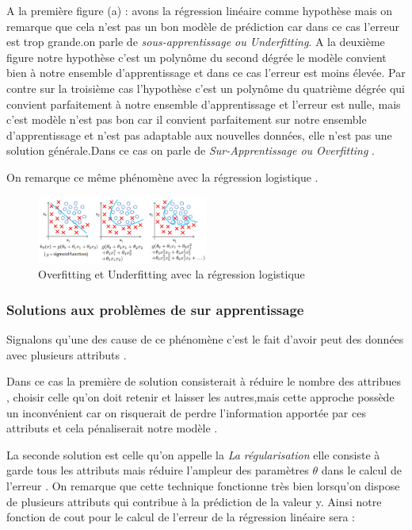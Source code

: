 A la première figure (a) : avons la régression linéaire comme hypothèse  mais on remarque que cela n'est pas un bon modèle de prédiction car dans ce cas l'erreur est trop grande.on parle de \emph{sous-apprentissage ou Underfitting}.
A la deuxième figure notre hypothèse c'est un polynôme du second dégrée le modèle convient bien à notre ensemble d'apprentissage et dans ce cas l'erreur est moins élevée.
Par contre sur la troisième cas l'hypothèse c'est un polynôme du quatrième dégrée qui convient parfaitement à notre ensemble d'apprentissage et l'erreur est nulle, mais c'est modèle n'est pas bon  car il  convient parfaitement sur notre ensemble d'apprentissage et n'est pas adaptable aux nouvelles données, elle n'est pas une solution générale.Dans ce cas on parle de \emph{Sur-Apprentissage ou Overfitting } .

On remarque ce même phénomène avec la régression logistique .

\begin{figure}[H]
	\centering
	\includegraphics[width=0.5\textwidth]{fig/OverfiittingLogistic.png}
	\caption{Overfitting et Underfitting avec la régression logistique }
	\label{fig:image8}
\end{figure}
\subsubsection{Solutions aux problèmes de sur apprentissage }
Signalons qu'une des cause de ce phénomène c'est le fait d'avoir peut des données avec plusieurs attributs .

Dans ce cas la première de solution consisterait à réduire le nombre des attribues , choisir celle qu'on doit retenir et laisser les autres,mais cette approche possède un inconvénient car on risquerait de perdre l'information apportée par ces attributs et cela pénaliserait notre modèle .

La seconde solution est celle qu'on appelle la \emph{La régularisation } elle consiste à garde tous les attributs mais réduire l'ampleur des paramètres  $\theta$ dans le calcul de l'erreur . On remarque que cette technique fonctionne très bien lorsqu'on dispose de plusieurs attributs qui contribue à la prédiction de la valeur y.
Ainsi notre fonction de cout pour le calcul de l'erreur de la régression linéaire sera :

